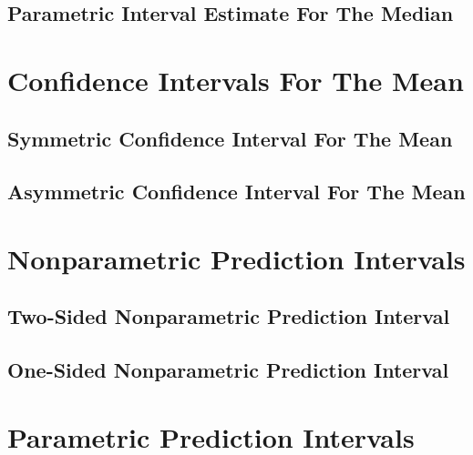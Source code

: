 \documentclass[]{book}
\begin{document}
\hypertarget{parametric-interval-estimate-for-the-median}{%
\subsection{Parametric Interval Estimate For The Median}\label{parametric-interval-estimate-for-the-median}}

\hypertarget{confidence-intervals-for-the-mean}{%
\section{Confidence Intervals For The Mean}\label{confidence-intervals-for-the-mean}}

\hypertarget{symmetric-confidence-interval-for-the-mean}{%
\subsection{Symmetric Confidence Interval For The Mean}\label{symmetric-confidence-interval-for-the-mean}}

\hypertarget{asymmetric-confidence-interval-for-the-mean}{%
\subsection{Asymmetric Confidence Interval For The Mean}\label{asymmetric-confidence-interval-for-the-mean}}

\hypertarget{nonparametric-prediction-intervals}{%
\section{Nonparametric Prediction Intervals}\label{nonparametric-prediction-intervals}}

\hypertarget{two-sided-nonparametric-prediction-interval}{%
\subsection{Two-Sided Nonparametric Prediction Interval}\label{two-sided-nonparametric-prediction-interval}}

\hypertarget{one-sided-nonparametric-prediction-interval}{%
\subsection{One-Sided Nonparametric Prediction Interval}\label{one-sided-nonparametric-prediction-interval}}

\hypertarget{parametric-prediction-intervals}{%
\section{Parametric Prediction Intervals}\label{parametric-prediction-intervals}}
\end{document}
